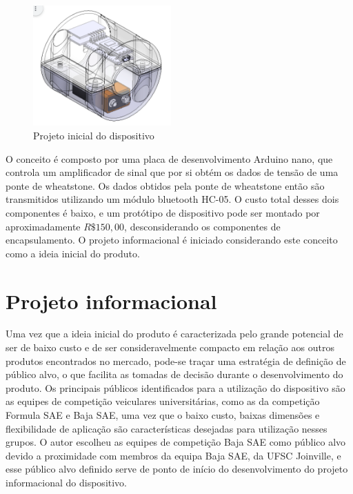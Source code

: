 \begin{figure}[htb]
	\caption{\label{fig:2029} Projeto inicial do dispositivo}
	\begin{center}
		\includegraphics[width=200]{pictures/2029.png}
	\end{center}
\end{figure}

O conceito é composto por uma placa de desenvolvimento Arduino nano, que controla um amplificador de sinal que por si obtém os dados de tensão de uma ponte de wheatstone.
Os dados obtidos pela ponte de wheatstone então são transmitidos utilizando um módulo bluetooth HC-05.
O custo total desses dois componentes é baixo, e um protótipo de dispositivo pode ser montado por aproximadamente $R\$150,00$, desconsiderando os componentes de encapsulamento.
O projeto informacional é iniciado considerando este conceito como a ideia inicial do produto.

\section{Projeto informacional}

Uma vez que a ideia inicial do produto é caracterizada pelo grande potencial de ser de baixo custo e de ser consideravelmente compacto em relação aos outros produtos encontrados no
mercado, pode-se traçar uma estratégia de definição de público alvo, o que facilita as tomadas de decisão durante o desenvolvimento do produto.
Os principais públicos identificados para a utilização do dispositivo são as equipes de competição veiculares universitárias, como as da competição Formula SAE e Baja SAE,
uma vez que o baixo custo, baixas dimensões e flexibilidade de aplicação são características desejadas para utilização nesses grupos.
O autor escolheu as equipes de competição Baja SAE como público alvo devido a proximidade com membros da equipa Baja SAE, da UFSC Joinville, e esse público alvo definido serve de ponto
de início do desenvolvimento do projeto informacional do dispositivo.

